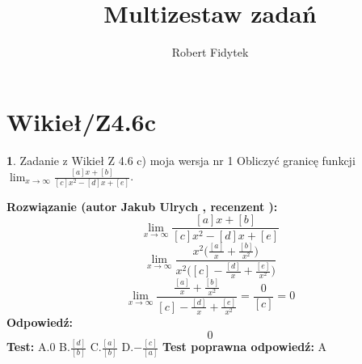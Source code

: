 \documentclass[12pt, a4paper]{article}
\title{Multizestaw zadań}
\author{Robert Fidytek}
\date{}
\theoremstyle{definition} %
\newtheorem{zad}{}
\newcommand{\kategoria}[1]{\section{#1}} %
\newcommand{\zadStart}[1]{\begin{zad}#1\newline} %
\newcommand{\zadStop}{\end{zad}}   %
\newcommand{\rozwStart}[2]{\noindent \textbf{Rozwiązanie (autor #1 , recenzent #2): }\newline} %
\newcommand{\rozwStop}{\newline}                                            %
\newcommand{\odpStart}{\noindent \textbf{Odpowiedź:}\newline}    %
\newcommand{\odpStop}{\newline}                                             %
\newcommand{\testStart}{\noindent \textbf{Test:}\newline} %
\newcommand{\testStop}{\newline} %
\newcommand{\kluczStart}{\noindent \textbf{Test poprawna odpowiedź:}\newline} %
\newcommand{\kluczStop}{\newline} %
\begin{document}
\maketitle


\kategoria{Wikieł/Z4.6c}
\zadStart{Zadanie z Wikieł Z 4.6 c) moja wersja nr 1}
Obliczyć granicę funkcji $\lim_{x \to \infty}\frac{[a]x+[b]}{[c]x^{2}-[d]x+[e]}$.
\zadStop
\rozwStart{Jakub Ulrych}{}
$$\lim_{x \to \infty}\frac{[a]x+[b]}{[c]x^{2}-[d]x+[e]}$$
$$\lim_{x \to \infty}\frac{x^{2}\big(\frac{[a]}{x}+\frac{[b]}{x^{2}}\big)}{x^{2}\big([c]-\frac{[d]}{x}+\frac{[e]}{x^{2}}\big)}$$
$$\lim_{x \to \infty}\frac{\frac{[a]}{x}+\frac{[b]}{x^{2}}}{[c]-\frac{[d]}{x}+\frac{[e]}{x^{2}}}=\frac{0}{[c]}=0$$
\rozwStop
\odpStart
$$0$$
\odpStop
\testStart
A.$0$
B.$\frac{[d]}{[b]}$
C.$\frac{[a]}{[b]}$
D.$-\frac{[c]}{[a]}$
\testStop
\kluczStart
A
\kluczStop
\end{document}
